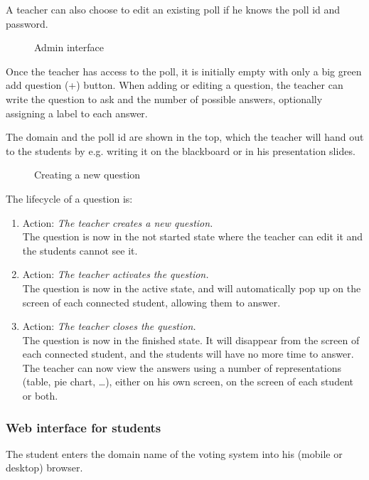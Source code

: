 \documentclass{acm_proc_article-sp}
\begin{document}
A teacher can also choose to edit an existing poll if he knows the poll id and password.

\begin{figure}[h]
\centering
{}
\caption{Admin interface}
\label{fig:polls}
\end{figure}

Once the teacher has access to the poll, it is initially empty with only a big green add question (+) button. When adding or editing a question, the teacher can write the question to ask and the number of possible answers, optionally assigning a label to each answer.

The domain and the poll id are shown in the top, which the teacher will hand out to the students by e.g. writing it on the blackboard or in his presentation slides.

\begin{figure}[h]
\centering
{}
\caption{Creating a new question}
\label{fig:create_question}
\end{figure}
The lifecycle of a question is:
\begin{enumerate}
  \item Action: \textit{The teacher creates a new question.}\\
  The question is now in the not started state where the teacher can edit it and the students cannot see it.
  
  \item Action: \textit{The teacher activates the question.} \\ 
  The question is now in the active state, and will automatically pop up on the screen of each connected student, allowing them to answer.
  \item Action:  \textit{The teacher closes the question.} \\
The question is now in the finished state. It will disappear from the screen of each connected student, and the students will have no more time to answer. The teacher can now view the answers using a number of representations (table, pie chart, …), either on his own screen, on the screen of each student or both.
\end{enumerate}

\subsubsection{Web interface for students}
The student enters the domain name of the voting system into his (mobile or desktop) browser.
\end{document}
